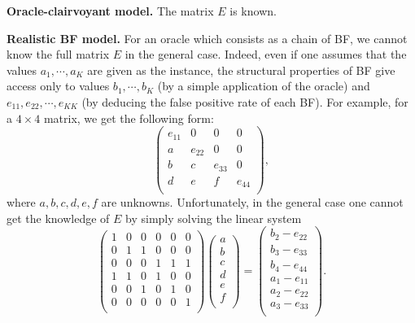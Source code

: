 \documentclass{article}
\begin{document}
\noindent\textbf{Oracle-clairvoyant model.} The matrix \(E\) is known.

\noindent\textbf{Realistic BF model.}
For an oracle which consists as a chain of BF, we cannot know the full matrix
\(E\) in the general case. Indeed, even if one assumes that the values \(a_1,\cdots,a_K\) are given as the instance,
the structural properties of BF give access only to values \(b_1,\cdots,b_K\) (by a simple application of the oracle)
and \(e_{11},e_{22},\cdots,e_{KK}\) (by deducing the false positive rate of each BF). For example, for a
\(4\times 4\) matrix, we get the following form:
\[
    \begin{pmatrix}
        e_{11} & 0      & 0      & 0      \\
        a      & e_{22} & 0      & 0      \\
        b      & c      & e_{33} & 0      \\
        d      & e      & f      & e_{44} \\
    \end{pmatrix},
\]
where \(a,b,c,d,e,f\) are unknowns. Unfortunately, in the general case one cannot get the knowledge of \(E\) by simply
solving the linear system
\[
    \begin{pmatrix}
        1 & 0 & 0 & 0 & 0 & 0 \\
        0 & 1 & 1 & 0 & 0 & 0 \\
        0 & 0 & 0 & 1 & 1 & 1 \\
        1 & 1 & 0 & 1 & 0 & 0 \\
        0 & 0 & 1 & 0 & 1 & 0 \\
        0 & 0 & 0 & 0 & 0 & 1 \\
    \end{pmatrix}
    \begin{pmatrix}
        a \\ b \\ c \\ d \\ e \\ f \\
    \end{pmatrix}
    =
    \begin{pmatrix}
        b_2-e_{22} \\
        b_3-e_{33} \\
        b_4-e_{44} \\
        a_1-e_{11} \\
        a_2-e_{22} \\
        a_3-e_{33} \\
    \end{pmatrix}.
\]
\end{document}

